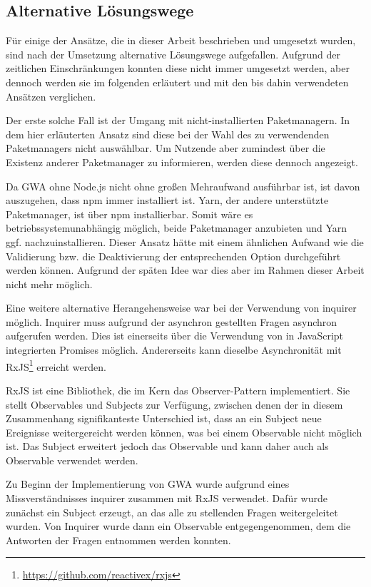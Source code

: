 \subsection{Alternative Lösungswege}
Für einige der Ansätze, die in dieser Arbeit beschrieben und umgesetzt wurden, sind nach der Umsetzung alternative Lösungswege aufgefallen. Aufgrund der zeitlichen Einschränkungen konnten diese nicht immer umgesetzt werden, aber dennoch werden sie im folgenden erläutert und mit den bis dahin verwendeten Ansätzen verglichen.

Der erste solche Fall ist der Umgang mit nicht-installierten Paketmanagern. In dem hier erläuterten Ansatz sind diese bei der Wahl des zu verwendenden Paketmanagers nicht auswählbar. Um Nutzende aber zumindest über die Existenz anderer Paketmanager zu informieren, werden diese dennoch angezeigt.

Da \gls{GWA} ohne Node.js nicht ohne großen Mehraufwand ausführbar ist, ist davon auszugehen, dass \gls{npm} immer installiert ist. Yarn, der andere unterstützte Paketmanager, ist über \gls{npm} installierbar. Somit wäre es betriebssystemunabhängig möglich, beide Paketmanager anzubieten und Yarn ggf. nachzuinstallieren. Dieser Ansatz hätte mit einem ähnlichen Aufwand wie die Validierung bzw. die Deaktivierung der entsprechenden Option durchgeführt werden können. Aufgrund der späten Idee war dies aber im Rahmen dieser Arbeit nicht mehr möglich.

Eine weitere alternative Herangehensweise war bei der Verwendung von inquirer möglich. Inquirer muss aufgrund der asynchron gestellten Fragen asynchron aufgerufen werden. Dies ist einerseits über die Verwendung von in JavaScript integrierten Promises möglich. Andererseits kann dieselbe Asynchronität mit RxJS\footnote{\url{https://github.com/reactivex/rxjs}} erreicht werden.

RxJS ist eine Bibliothek, die im Kern das Observer-Pattern implementiert. Sie stellt Observables und Subjects zur Verfügung, zwischen denen der in diesem Zusammenhang signifikanteste Unterschied ist, dass an ein Subject neue Ereignisse weitergereicht werden können, was bei einem Observable nicht möglich ist. Das Subject erweitert jedoch das Observable und kann daher auch als Observable verwendet werden.

Zu Beginn der Implementierung von \gls{GWA} wurde aufgrund eines Missverständnisses inquirer zusammen mit RxJS verwendet. Dafür wurde zunächst ein Subject erzeugt, an das alle zu stellenden Fragen weitergeleitet wurden. Von Inquirer wurde dann ein Observable entgegengenommen, dem die Antworten der Fragen entnommen werden konnten.

